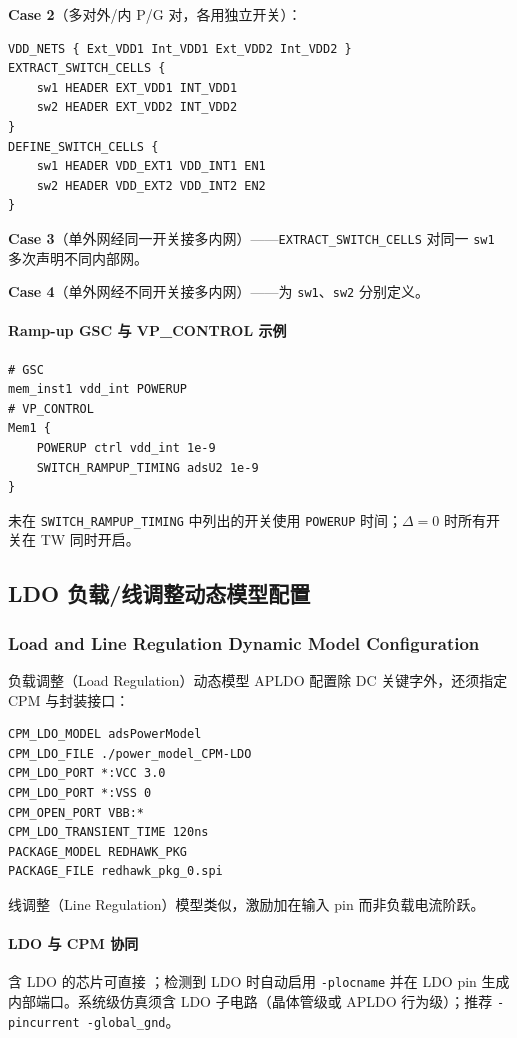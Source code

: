 \textbf{Case 2}（多对外/内 P/G 对，各用独立开关）：
\begin{lstlisting}
VDD_NETS { Ext_VDD1 Int_VDD1 Ext_VDD2 Int_VDD2 }
EXTRACT_SWITCH_CELLS {
    sw1 HEADER EXT_VDD1 INT_VDD1
    sw2 HEADER EXT_VDD2 INT_VDD2
}
DEFINE_SWITCH_CELLS {
    sw1 HEADER VDD_EXT1 VDD_INT1 EN1
    sw2 HEADER VDD_EXT2 VDD_INT2 EN2
}
\end{lstlisting}

\textbf{Case 3}（单外网经同一开关接多内网）——\texttt{EXTRACT\_SWITCH\_CELLS} 对同一 \texttt{sw1} 多次声明不同内部网。

\textbf{Case 4}（单外网经不同开关接多内网）——为 \texttt{sw1}、\texttt{sw2} 分别定义。

\paragraph{Ramp-up GSC 与 VP\_CONTROL 示例}
\begin{lstlisting}
# GSC
mem_inst1 vdd_int POWERUP
# VP_CONTROL
Mem1 {
    POWERUP ctrl vdd_int 1e-9
    SWITCH_RAMPUP_TIMING adsU2 1e-9
}
\end{lstlisting}
未在 \texttt{SWITCH\_RAMPUP\_TIMING} 中列出的开关使用 \texttt{POWERUP} 时间；$\Delta=0$ 时所有开关在 TW 同时开启。

\subsection{LDO 负载/线调整动态模型配置}
\subsubsection*{Load and Line Regulation Dynamic Model Configuration}

负载调整（Load Regulation）动态模型 APLDO 配置除 DC 关键字外，还须指定 CPM 与封装接口：
\begin{lstlisting}
CPM_LDO_MODEL adsPowerModel
CPM_LDO_FILE ./power_model_CPM-LDO
CPM_LDO_PORT *:VCC 3.0
CPM_LDO_PORT *:VSS 0
CPM_OPEN_PORT VBB:*
CPM_LDO_TRANSIENT_TIME 120ns
PACKAGE_MODEL REDHAWK_PKG
PACKAGE_FILE redhawk_pkg_0.spi
\end{lstlisting}

线调整（Line Regulation）模型类似，激励加在输入 pin 而非负载电流阶跃。

\paragraph{LDO 与 CPM 协同}
含 LDO 的芯片可直接 ；检测到 LDO 时自动启用 \texttt{-plocname} 并在 LDO pin 生成内部端口。系统级仿真须含 LDO 子电路（晶体管级或 APLDO 行为级）；推荐 \texttt{-pincurrent -global\_gnd}。


